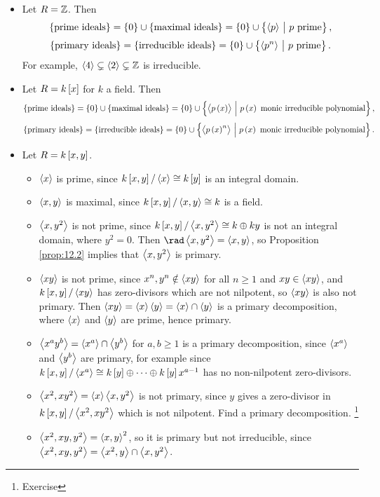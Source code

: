 \begin{example*}
\hfill
\begin{itemize}
\item Let $ R = \mathbb{Z} $. Then
$$ \cbr{\text{prime ideals}} = \cbr{0} \cup \cbr{\text{maximal ideals}} = \cbr{0} \cup \cbr{\abr{p} \st p \ \text{prime}}, $$
$$ \cbr{\text{primary ideals}} = \cbr{\text{irreducible ideals}} = \cbr{0} \cup \cbr{\abr{p^n} \st p \ \text{prime}}. $$
For example, $ \left\langle 4 \right\rangle \subsetneq \left\langle 2 \right\rangle \subsetneq \mathbb{Z} $ is irreducible.
\item Let $ R = k\sbr{x} $ for $ k $ a field. Then
$$ \cbr{\text{prime ideals}} = \cbr{0} \cup \cbr{\text{maximal ideals}} = \cbr{0} \cup \cbr{\abr{p\br{x}} \st p\br{x} \ \text{monic irreducible polynomial}}, $$
$$ \cbr{\text{primary ideals}} = \cbr{\text{irreducible ideals}} = \cbr{0} \cup \cbr{\abr{p\br{x}^n} \st p\br{x} \ \text{monic irreducible polynomial}}. $$
\item Let $ R = k\sbr{x, y} $.
\begin{itemize}
\item $ \left\langle x \right\rangle $ is prime, since $ k\sbr{x, y} / \abr{x} \cong k\sbr{y} $ is an integral domain.
\item $ \left\langle x, y \right\rangle $ is maximal, since $ k\sbr{x, y} / \abr{x, y} \cong k $ is a field.
\item $ \left\langle x, y^2 \right\rangle $ is not prime, since $ k\sbr{x, y} / \abr{x, y^2} \cong k \oplus ky $ is not an integral domain, where $ y^2 = 0 $. Then $ \rad \abr{x, y^2} = \abr{x, y} $, so Proposition \ref{prop:12.2} implies that $ \left\langle x, y^2 \right\rangle $ is primary.
\item $ \left\langle xy \right\rangle $ is not prime, since $ x^n, y^n \notin \left\langle xy \right\rangle $ for all $ n \ge 1 $ and $ xy \in \left\langle xy \right\rangle $, and $ k\sbr{x, y} / \abr{xy} $ has zero-divisors which are not nilpotent, so $ \left\langle xy \right\rangle $ is also not primary. Then $ \left\langle xy \right\rangle = \left\langle x \right\rangle\left\langle y \right\rangle = \left\langle x \right\rangle \cap \left\langle y \right\rangle $ is a primary decomposition, where $ \left\langle x \right\rangle $ and $ \left\langle y \right\rangle $ are prime, hence primary.
\item $ \left\langle x^ay^b \right\rangle = \left\langle x^a \right\rangle \cap \left\langle y^b \right\rangle $ for $ a, b \ge 1 $ is a primary decomposition, since $ \left\langle x^a \right\rangle $ and $ \left\langle y^b \right\rangle $ are primary, for example since $ k\sbr{x, y} / \abr{x^a} \cong k\sbr{y} \oplus \dots \oplus k\sbr{y}x^{a - 1} $ has no non-nilpotent zero-divisors.
\item $ \left\langle x^2, xy^2 \right\rangle = \left\langle x \right\rangle\left\langle x, y^2 \right\rangle $ is not primary, since $ y $ gives a zero-divisor in $ k\sbr{x, y} / \abr{x^2, xy^2} $ which is not nilpotent. Find a primary decomposition. \footnote{Exercise}
\item $ \left\langle x^2, xy, y^2 \right\rangle = \left\langle x, y \right\rangle^2 $, so it is primary but not irreducible, since $ \left\langle x^2, xy, y^2 \right\rangle = \left\langle x^2, y \right\rangle \cap \left\langle x, y^2 \right\rangle $.
\end{itemize}
\end{itemize}
\end{example*}

